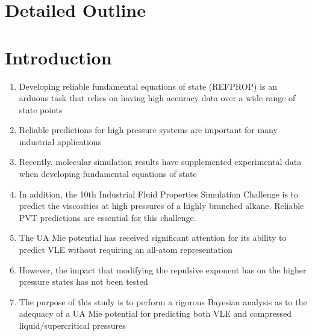 \documentclass[preprint,letterpaper,floatfix,citeautoscript,aip,jcp]{revtex4-1}
\begin{document}

\section*{Detailed Outline}

\section{Introduction}

\begin{enumerate}
	\item Developing reliable fundamental equations of state (REFPROP) is an arduous task that relies on having high accuracy data over a wide range of state points
	\item Reliable predictions for high pressure systems are important for many industrial applications
	\item Recently, molecular simulation results have supplemented experimental data when developing fundamental equations of state
	\item In addition, the 10th Industrial Fluid Properties Simulation Challenge is to predict the viscosities at high pressures of a highly branched alkane. Reliable PVT predictions are essential for this challenge.
	\item The UA Mie potential has received significant attention for its ability to predict VLE without requiring an all-atom representation
	\item However, the impact that modifying the repulsive exponent has on the higher pressure states has not been tested
	\item The purpose of this study is to perform a rigorous Bayesian analysis as to the adequacy of a UA Mie potential for predicting both VLE and compressed liquid/supercritical pressures
\end{enumerate}
\end{document}

